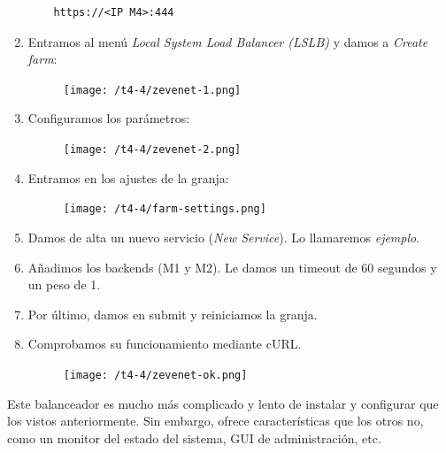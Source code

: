 \documentclass[12pt,spanish]{article}
\begin{document}
\begin{enumerate}
	\begin{lstlisting}
	https://<IP M4>:444
	\end{lstlisting}
	\item Entramos al menú \emph{Local System Load Balancer (LSLB)} y damos a \emph{Create farm}:
	\begin{figure}[H]
		\centering
		\texttt{[image: /t4-4/zevenet-1.png]}
	\end{figure}
	\item Configuramos los parámetros:
	\begin{figure}[H]
		\centering
		\texttt{[image: /t4-4/zevenet-2.png]}
	\end{figure}
	\item Entramos en los ajustes de la granja:
	\begin{figure}[H]
		\centering
		\texttt{[image: /t4-4/farm-settings.png]}
	\end{figure}
	\item Damos de alta un nuevo servicio (\emph{New Service}). Lo llamaremos \emph{ejemplo}.
	\item Añadimos los backends (M1 y M2). Le damos un timeout de 60 segundos y un peso de 1.
	\item Por último, damos en submit y reiniciamos la granja.
	\item Comprobamos su funcionamiento mediante cURL.
	\begin{figure}[H]
		\centering
		\texttt{[image: /t4-4/zevenet-ok.png]}
	\end{figure}
\end{enumerate}

Este balanceador es mucho más complicado y lento de instalar y configurar que los vistos anteriormente. Sin embargo, ofrece características que los otros no, como un monitor del estado del sistema, GUI de administración, etc.
\end{document}
